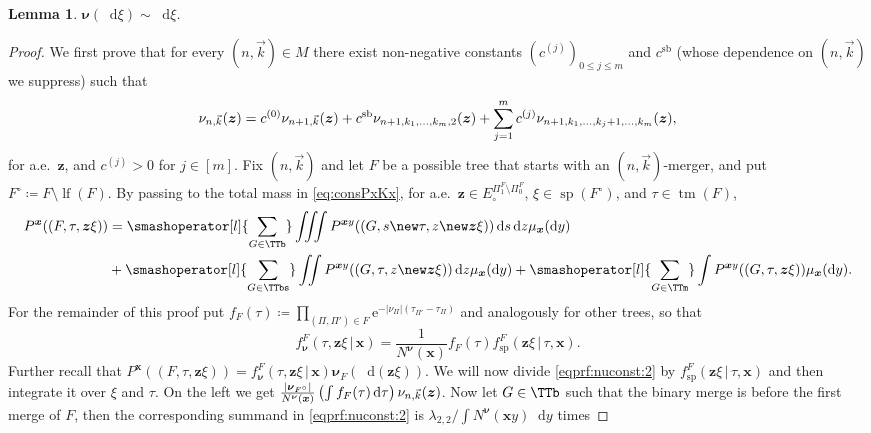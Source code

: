 \documentclass[reqno,draft]{amsart}
\numberwithin{equation}{section}
\theoremstyle{plain}
\newtheorem{lemma}[theorem]{Lemma}
\theoremstyle{remark}
\newcommand*\diff{\mathop{}\!\mathrm{d}}
\newcommand{\e}{\mathrm{e}}
\newcommand{\fpart}{\Pi} %
\newcommand{\mergers}{M}
\DeclareMathOperator{\lf}{lf}
\DeclareMathOperator{\dct}{tm}
\DeclareMathOperator{\dcs}{sp}
\newcommand{\fsp}{f_\mathrm{sp}}
\newcommand{\fnu}{f_{\boldsymbol \nu}}
\newcommand{\nut}[1]{|\nu_{#1}|}
\newcommand{\nunk}{\nu_{n,\smash{\vec{k}}}}
\newcommand{\cnk}{c}%
\begin{document}
\begin{lemma}\label{lem:nuconst}
    $\boldsymbol \nu(\diff \xi) \sim \diff \xi$.
\end{lemma}
\begin{proof}%
    We first prove that for every $(n,\vec{k})\in \mergers$ there exist non-negative constants $(\cnk^{(j)})_{0\le j\le m}$ and $\cnk^\text{sb}$ (whose dependence on $(n,\vec{k})$ we suppress) such that
    \begin{equation}\label{eqprf:nuconst:1}
        \nunk(\boldsymbol z) = \cnk^{(0)} \nu_{n+1,\smash{\vec{k}}}(\boldsymbol z) + \cnk^\text{sb} \nu_{n+1,k_1, \ldots ,k_m,2}(\boldsymbol z) + \sum_{j=1}^m \cnk^{(j)} \nu_{n+1,k_1, \ldots ,k_j+1, \ldots ,k_m}(\boldsymbol z),
    \end{equation}
    for a.e.\ $\boldsymbol z$, and $\cnk^{(j)}> 0$ for $j\in [m]$. Fix $(n,\vec{k})$ and let $F$ be a possible tree that starts with an $(n,\vec{k})$-merger, and put $F^\circ \coloneqq F\setminus \lf(F)$. By passing to the total mass in \cref{eq:consPxKx}, for a.e.\ $\boldsymbol z\in E^{\fpart^F_1\setminus \fpart^F_0}_\circ $, $\xi\in \dcs(F^\circ )$, and $\tau \in \dct(F)$,
    \begin{align}
        P^{\boldsymbol x}((F,\tau,\boldsymbol z\xi))
        &= \smashoperator[l]{\sum_{G\in \TTb}} \iiint P^{\boldsymbol x y}((G,s\new\tau,z\new\boldsymbol z\xi)) \diff s\diff z \mu_{\boldsymbol x}(\diff y) \nonumber\\
        & + \smashoperator[l]{\sum_{G\in \TTbs}} \iint P^{\boldsymbol x y}((G,\tau,z\new\boldsymbol z\xi)) \diff z\mu_{\boldsymbol x}(\diff y) + \smashoperator[l]{\sum_{G\in \TTm}} \int P^{\boldsymbol x y}((G,\tau,\boldsymbol z\xi)) \mu_{\boldsymbol x}(\diff y).\label{eqprf:nuconst:2}
    \end{align}
    For the remainder of this proof put $f_F(\tau) \coloneqq \prod_{(\fpart,\fpart') \in F} \e^{-\nut{\fpart}(\tau_{\fpart'}-\tau_\fpart)}$ and analogously for other trees, so that \[
        \fnu^F(\tau,\boldsymbol z\xi \,\vert\,\boldsymbol x) = \frac{1}{N^{\boldsymbol\nu}(\boldsymbol x)} f_F(\tau) \fsp^F(\boldsymbol z\xi \,\vert\,\tau,\boldsymbol x).
    \] Further recall that $P^{\boldsymbol x}((F,\tau,\boldsymbol z\xi)) = \fnu^F(\tau,\boldsymbol z\xi \,\vert\,\boldsymbol x) \boldsymbol \nu_F(\diff (\boldsymbol z\xi))$. We will now divide \cref{eqprf:nuconst:2} by $\fsp^F(\boldsymbol z\xi \,\vert\,\tau,\boldsymbol x)$ and then integrate it over $\xi$ and $\tau$. On the left we get $\frac{|\boldsymbol \nu_{F^\circ }|}{N^{\boldsymbol\nu}(\boldsymbol x)} \left(\int f_F(\tau) \diff \tau\right) \nunk(\boldsymbol z)$. Now let $G\in \TTb$ such that the binary merge is before the first merge of $F$, then the corresponding summand in \cref{eqprf:nuconst:2} is $\lambda_{2,2} / \int N^{\boldsymbol\nu}(\boldsymbol x y)\diff y$ times

\end{proof}
\end{document}
